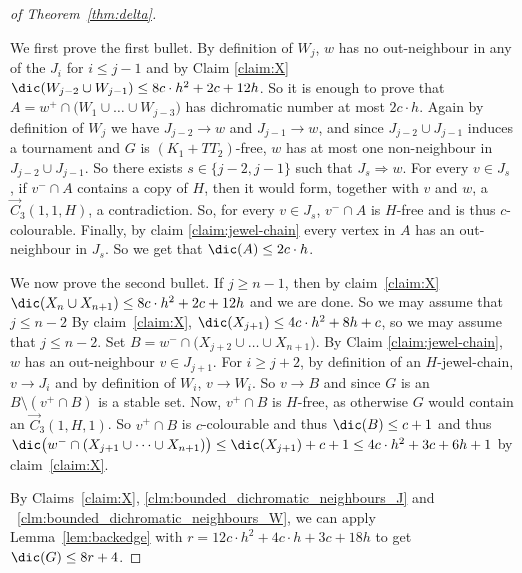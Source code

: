 \begin{proof}[of Theorem~\ref{thm:delta}]
\begin{subproof}
We first prove the first  bullet. 
By definition of $W_j$, $w$ has no out-neighbour in any of the $J_i$ for $i\leq j-1$ and by Claim \ref{claim:X} $\dic(W_{j-2} \cup W_{j-1}) \leq  8c \cdot h^2 + 2c + 12h $. So it is enough to prove that $A= w^+ \cap \big(W_1 \cup \dots \cup W_{j-3}  \big)$ has  dichromatic number at most $2c \cdot h$. 
Again by definition of $W_j$ we have $J_{j-2}\rightarrow w$ and $J_{j-1} \rightarrow w$, and since $J_{j-2} \cup J_{j-1}$ induces a tournament and $G$ is $(K_1 + TT_2)$-free, $w$ has at most one non-neighbour in $J_{j-2} \cup J_{j-1}$. 
So there exists $s \in \{j-2, j-1\}$ such that $J_s \Rightarrow w$. 
For every $v \in J_s$, if $v^- \cap A$ contains a copy of $H$, then it would form, together with $v$ and $w$, a $\vec C_{3}(1, 1, H)$, a contradiction. So, for every $v \in J_s$, $v^- \cap A$ is $H$-free and is thus $c$-colourable. Finally, by claim \ref{claim:jewel-chain} every vertex in $A$ has an out-neighbour in $J_s$. So we get that $\dic(A) \leq 2c \cdot h$. 

We now prove the second bullet. 
If $j \geq n-1$, then by claim~\ref{claim:X} $\dic(X_n \cup X_{n+1}) \leq 8c \cdot h^2 + 2c + 12h$ and we are done. So we may assume that $j \leq n-2$
By claim~\ref{claim:X}, $\dic(X_{j+1}) \leq 4c \cdot h^2+ 8h + c$, so we may assume that $j\leq n-2$. 
Set $B = w^- \cap \big(X_{j+2} \cup \dots \cup X_{n+1} \big)$. %
By Claim \ref{claim:jewel-chain}, $w$ has an out-neighbour $v \in J_{j+1}$. For $i \geq j+2$, by definition of an $H$-jewel-chain, $v \rightarrow J_i$ and by definition of $W_i$, $v \rightarrow W_i$. So $v \rightarrow B$ and since $G$ is an \omg $B\setminus (v^+\cap B)$ is a stable set. Now, $v^+ \cap B$ is $H$-free, as otherwise $G$ would contain an $\vec C_{3}(1, H, 1)$. So $v^+ \cap B$ is $c$-colourable and thus $\dic(B) \leq c +1$ and thus $ \dic\big(w^- \cap (X_{j+1} \cup \dots \cup X_{n+1}) \big) \leq \dic(X_{j+1}) + c + 1 \leq 4c \cdot h^2 + 3c + 6h + 1$  by claim~\ref{claim:X}. 
\end{subproof}



By Claims~\ref{claim:X}, \ref{clm:bounded_dichromatic_neighbours_J} and ~\ref{clm:bounded_dichromatic_neighbours_W}, we can apply Lemma~\ref{lem:backedge} with $r = 12c \cdot h^2 + 4c \cdot h + 3c + 18h$ to get $\dic(G) \leq 8r+4$. 
\end{proof}


